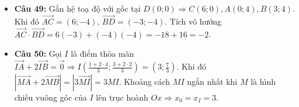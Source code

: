 \documentclass[12pt,a4paper]{article}
\begin{document}
\begin{itemize}[leftmargin=1.5em, itemsep=1.8pt]
    \item \textbf{Câu 49:} Gắn hệ toạ độ với gốc tại $D(0; 0) \Rightarrow C(6; 0), A(0; 4), B(3; 4)$. Khi đó $\vec{AC} = (6; -4)$, $\vec{BD} = (-3; -4)$. Tích vô hướng $\vec{AC} \cdot \vec{BD} = 6(-3) + (-4)(-4) = -18 + 16 = -2$.
    \item \textbf{Câu 50:} Gọi $I$ là điểm thỏa mãn $\vec{IA} + 2\vec{IB} = \vec{0} \Rightarrow I\left(\frac{1+2 \cdot 4}{3}; \frac{3+2 \cdot 2}{3}\right) = \left(3; \frac{7}{3}\right)$. Khi đó $|\vec{MA} + 2\vec{MB}| = |3\vec{MI}| = 3 MI$. Khoảng cách $MI$ ngắn nhất khi $M$ là hình chiếu vuông góc của $I$ lên trục hoành $Ox \Rightarrow x_0 = x_I = 3$.
\end{itemize}
\end{document}
